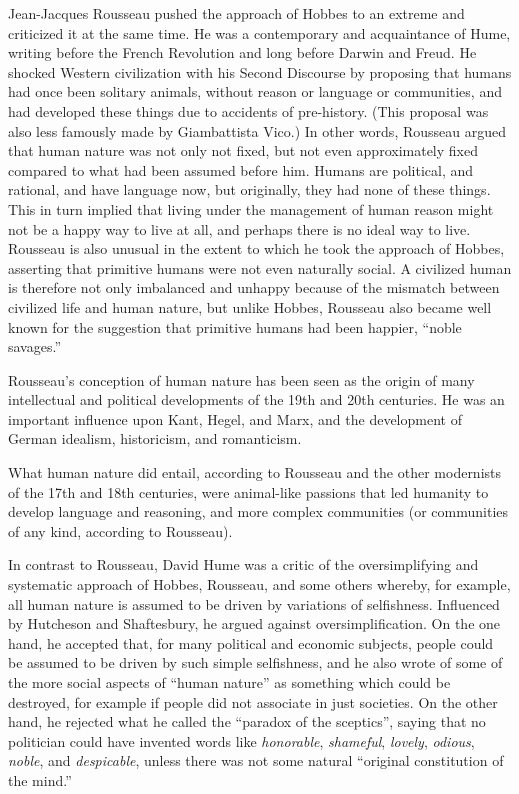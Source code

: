 Jean-Jacques Rousseau pushed the approach of Hobbes to an extreme and criticized it at the same time. He was a contemporary and acquaintance of Hume, writing before the French Revolution and long before Darwin and Freud. He shocked Western civilization with his Second Discourse by proposing that humans had once been solitary animals, without reason or language or communities, and had developed these things due to accidents of pre-history. (This proposal was also less famously made by Giambattista Vico.)  In other words, Rousseau argued that human nature was not only not fixed, but not even approximately fixed compared to what had been assumed before him. Humans are political, and rational, and have language now, but originally, they had none of these things. This in turn implied that living under the management of human reason might not be a happy way to live at all, and perhaps there is no ideal way to live. Rousseau is also unusual in the extent to which he took the approach of Hobbes, asserting that primitive humans were not even naturally social. A civilized human is therefore not only imbalanced and unhappy because of the mismatch between civilized life and human nature, but unlike Hobbes, Rousseau also became well known for the suggestion that primitive humans had been happier, “noble savages.”

Rousseau’s conception of human nature has been seen as the origin of many intellectual and political developments of the 19th and 20th centuries. He was an important influence upon Kant, Hegel, and Marx, and the development of German idealism, historicism, and romanticism.

What human nature did entail, according to Rousseau and the other modernists of the 17th and 18th centuries, were animal-like passions that led humanity to develop language and reasoning, and more complex communities (or communities of any kind, according to Rousseau).

In contrast to Rousseau, David Hume was a critic of the oversimplifying and systematic approach of Hobbes, Rousseau, and some others whereby, for example, all human nature is assumed to be driven by variations of selfishness. Influenced by Hutcheson and Shaftesbury, he argued against oversimplification. On the one hand, he accepted that, for many political and economic subjects, people could be assumed to be driven by such simple selfishness, and he also wrote of some of the more social aspects of ``human nature'' as something which could be destroyed, for example if people did not associate in just societies. On the other hand, he rejected what he called the ``paradox of the sceptics'', saying that no politician could have invented words like \textit{honorable}, \textit{shameful}, \textit{lovely}, \textit{odious}, \textit{noble}, and \textit{despicable}, unless there was not some natural ``original constitution of the mind.''

